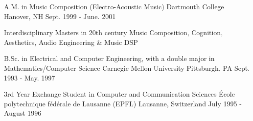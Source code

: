 

\begin{cventries}

  \cventry
    {A.M. in Music Composition (Electro-Acoustic Music)} %
    {Dartmouth College} %
    {Hanover, NH} %
    {Sept. 1999 - June. 2001} %
    {
      \begin{cvitems} %
        \item {Interdisciplinary Masters in 20th century Music Composition, Cognition, Aesthetics, Audio Engineering \& Music DSP}
      \end{cvitems}
    }

  \cventry
    {B.Sc. in Electrical and Computer Engineering, with a double major in Mathematics/Computer Science} %
    {Carnegie Mellon University} %
    {Pittsburgh, PA} %
    {Sept. 1993 - May. 1997} %
    {
      \begin{cvitems} %
      \end{cvitems}
    }
    
  \cventry
    {3rd Year Exchange Student in Computer and Communication Sciences} %
    {{\'E}cole polytechnique f{\'e}d{\'e}rale de Lausanne (EPFL)} %
    {Lausanne, Switzerland} %
    {July 1995 - August 1996} %
    {
      \begin{cvitems} %
      \end{cvitems}
    }
    
\end{cventries}
